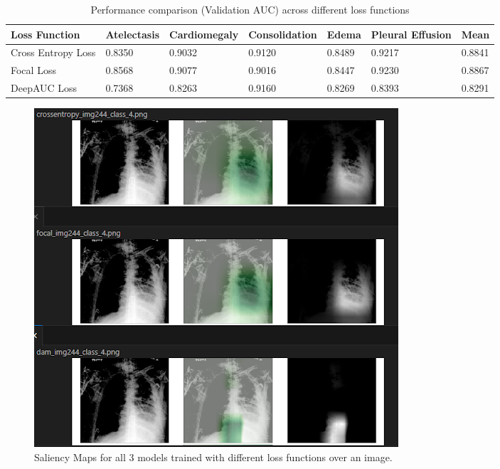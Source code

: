 \begin{table}[htbp]
\centering
\begin{tabular}{|p{1.8cm}|p{1.9cm}|p{2.4cm}|p{2.4cm}|p{1.3cm}|p{1.5cm}|p{1.1cm}|}
  \hline
   Loss Function & Atelectasis & Cardiomegaly & Consolidation & Edema & Pleural Effusion & Mean \\
  \hline
  Cross Entropy Loss &  0.8350 & 0.9032 & 0.9120 & 0.8489 & 0.9217 & 0.8841 \\
  \hline  
  Focal Loss & 0.8568 & 0.9077 & 0.9016 & 0.8447 & 0.9230 & 0.8867 \\
  \hline
  DeepAUC Loss & 0.7368 & 0.8263 & 0.9160 & 0.8269 & 0.8393 & 0.8291 \\
  \hline
\end{tabular}
\caption{\label{diffloss} Performance comparison (Validation AUC) across different loss functions}
\end{table}

\begin{figure}[!htbp]
  \begin{center}
    \leavevmode
    \ifpdf
      \includegraphics[scale=0.6]
      {Chapter3/Chapter3Figs/sal_diff_loss.png}    
    \fi
    \caption{Saliency Maps for all 3 models trained with different loss functions over an image.}
    \label{sal_diff_loss}
  \end{center}
\end{figure}

